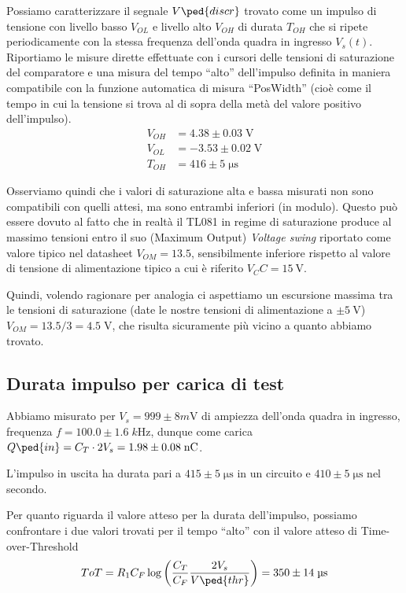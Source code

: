 \documentclass[10pt,a4paper]{article}
\begin{document}
Possiamo caratterizzare il segnale $V\ped{discr}$ trovato come un impulso di
tensione con livello basso $V_{OL}$ e livello alto $V_{OH}$ di durata
$T_{OH}$ che si ripete periodicamente con la stessa frequenza dell'onda quadra
in ingresso $V_s (t)$. Riportiamo le misure dirette effettuate con i cursori
delle tensioni di saturazione del comparatore e una misura del tempo ``alto''
dell'impulso definita in maniera compatibile con la funzione automatica di
misura ``PosWidth'' (cioè come il tempo in cui la tensione si trova al di
sopra della metà del valore positivo dell'impulso).
\begin{align*}
V_{OH} &= 4.38 \pm 0.03 \; \si{\V} \\
V_{OL} &= -3.53 \pm 0.02 \; \si{\V} \\
T_{OH} &= 416 \pm 5 \; \si{\micro\s}
\end{align*}

Osserviamo quindi che i valori di saturazione alta e bassa misurati non sono
compatibili con quelli attesi, ma sono entrambi inferiori (in modulo). Questo
può essere dovuto al fatto che in realtà il TL081 in regime di saturazione
produce al massimo tensioni entro il suo (Maximum Output) \emph{Voltage swing}
riportato come valore tipico nel datasheet $V_{OM} = 13.5$,
sensibilmente inferiore rispetto al valore di tensione di alimentazione tipico
a cui è riferito $V_CC = \SI{15}{\V}$.

Quindi, volendo ragionare per analogia ci aspettiamo un escursione massima tra
le tensioni di saturazione (date le nostre tensioni di alimentazione a
$\pm \SI{5}{\V}$) $V_{OM} = 13.5 / 3 = 4.5 \; \si{\V}$, che risulta
sicuramente più vicino a quanto abbiamo trovato.

\subsection{Durata impulso per carica di test}
Abbiamo misurato per $V_s = 999 \pm 8 \si{m\V}$ di ampiezza dell'onda quadra
in ingresso, frequenza $f = 100.0 \pm 1.6 \; \si{k\Hz}$, dunque come carica
$Q\ped{in} = C_T \cdot 2 V_s = 1.98 \pm 0.08 \; \si{n\coulomb}$.

L'impulso in uscita ha durata pari a $415 \pm 5 \; \si{\micro\s}$ in un circuito e $410 \pm 5 \; \si{\micro\s}$ nel secondo.

Per quanto riguarda il valore atteso per la durata dell'impulso, possiamo
confrontare i due valori trovati per il tempo ``alto'' con il valore atteso
di Time-over-Threshold
\[
ToT = R_1 C_F \log\left(\frac{C_T}{C_F} \frac{2 V_s}{V\ped{thr}}\right) =
350 \pm 14 \; \si{\micro\s}
\]
\end{document}

